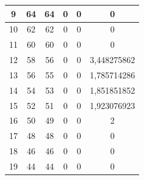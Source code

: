 \begin{table}[]
\begin{tabular}{|c|c|c|c|c|c|}
 			9                                            & 64                     & 64                    & 0                     & 0                      & 0                                                  \\ \hline
 			10                                           & 62                     & 62                    & 0                     & 0                      & 0                                                  \\ \hline
 			11                                           & 60                     & 60                    & 0                     & 0                      & 0                                                  \\ \hline
 			12                                           & 58                     & 56                    & 0                     & 0                      & 3,448275862                                        \\ \hline
 			13                                           & 56                     & 55                    & 0                     & 0                      & 1,785714286                                        \\ \hline
 			14                                           & 54                     & 53                    & 0                     & 0                      & 1,851851852                                        \\ \hline
 			15                                           & 52                     & 51                    & 0                     & 0                      & 1,923076923                                        \\ \hline
 			16                                           & 50                     & 49                    & 0                     & 0                      & 2                                                  \\ \hline
 			17                                           & 48                     & 48                    & 0                     & 0                      & 0                                                  \\ \hline
 			18                                           & 46                     & 46                    & 0                     & 0                      & 0                                                  \\ \hline
 			19                                           & 44                     & 44                    & 0                     & 0                      & 0                                                  \\ \hline

\end{tabular}
\end{table}

